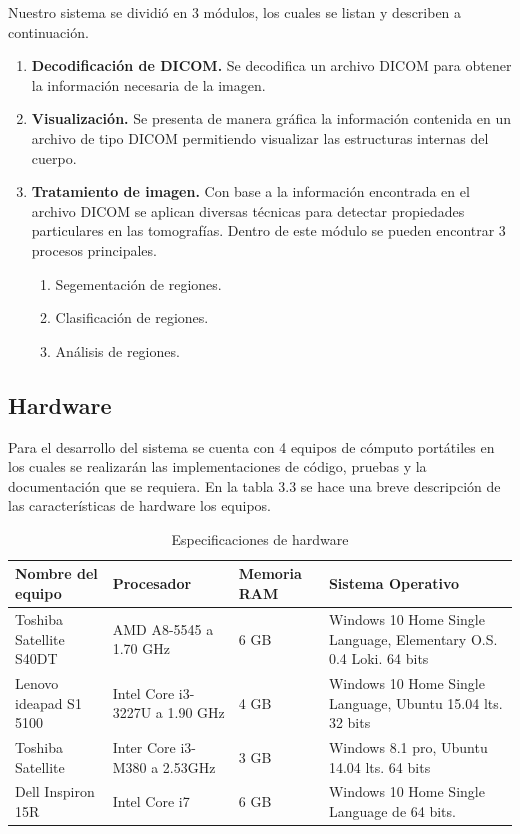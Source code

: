 \documentclass[12pt]{report}
\begin{document}
Nuestro sistema se dividió en 3 módulos, los cuales se listan y describen a continuación.

\begin{enumerate}[{Módulo} 1.]
\item \textbf{Decodificación de DICOM.} Se decodifica  un archivo DICOM para obtener la información necesaria de la imagen.
\item \textbf{Visualización.} Se presenta de manera gráfica la información contenida en un archivo de tipo DICOM permitiendo visualizar las estructuras internas del cuerpo.
\item \textbf{Tratamiento de imagen.} Con base a la información encontrada en el archivo DICOM se aplican diversas técnicas para detectar propiedades particulares en las tomografías. Dentro de este módulo se pueden encontrar 3 procesos principales.
\begin{enumerate}
\item Segementación de regiones.
\item Clasificación de regiones.
\item Análisis de regiones.
\end{enumerate}
\end{enumerate}

\subsection{Hardware}
Para el desarrollo del sistema se cuenta con 4 equipos de cómputo portátiles en los cuales se realizarán las implementaciones de código, pruebas y la documentación que se requiera. En la tabla 3.3 se hace una breve descripción de las características de hardware los equipos.

\begin{table}[H]
\begin{center}
\begin{tabular}{|p{30mm}|p{30mm}|p{20mm}|p{40mm}|}
\hline
 Nombre del equipo & Procesador & Memoria RAM & Sistema Operativo\\
\hline \hline 
Toshiba Satellite S40DT & AMD A8-5545 a 1.70 GHz  & 6 GB & Windows 10 Home Single Language, Elementary O.S. 0.4 Loki. 64 bits\\
\hline
Lenovo ideapad S1 5100 & Intel Core i3-3227U a 1.90 GHz & 4 GB & Windows 10 Home Single Language, Ubuntu 15.04 lts. 32 bits\\
\hline
Toshiba Satellite  & Inter Core i3-M380 a 2.53GHz  & 3 GB & Windows 8.1 pro, Ubuntu 14.04 lts. 64 bits\\
\hline
Dell Inspiron 15R & Intel Core i7 & 6 GB & Windows 10 Home Single Language de 64 bits. \\
\hline
\end{tabular}
\caption{Especificaciones de hardware}
\end{center}
\end{table}
\end{document}
